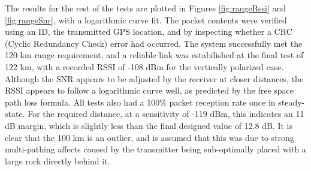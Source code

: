 The results for the rest of the tests are plotted in Figures \ref{fig:rangeRssi} and \ref{fig:rangeSnr}, with a logarithmic curve fit. The packet contents were verified using an ID, the transmitted GPS location, and by inspecting whether a CRC (Cyclic Redundancy Check) error had occurred. The system successfully met the 120 km range requirement, and a reliable link was estabilished at the final test of 122 km, with a recorded RSSI of -108 dBm for the vertically polarized case. Although the SNR appears to be adjusted by the receiver at closer distances, the RSSI appears to follow a logarithmic curve well, as predicted by the free space path loss formula. All tests also had a 100\% packet reception rate once in steady-state. For the required distance, at a sensitivity of -119 dBm, this indicates an 11 dB margin, which is slightly less than the final designed value of 12.8 dB. It is clear that the 100 km is an outlier, and is assumed that this was due to strong multi-pathing affects caused by the transmitter being sub-optimally placed with a large rock directly behind it. 